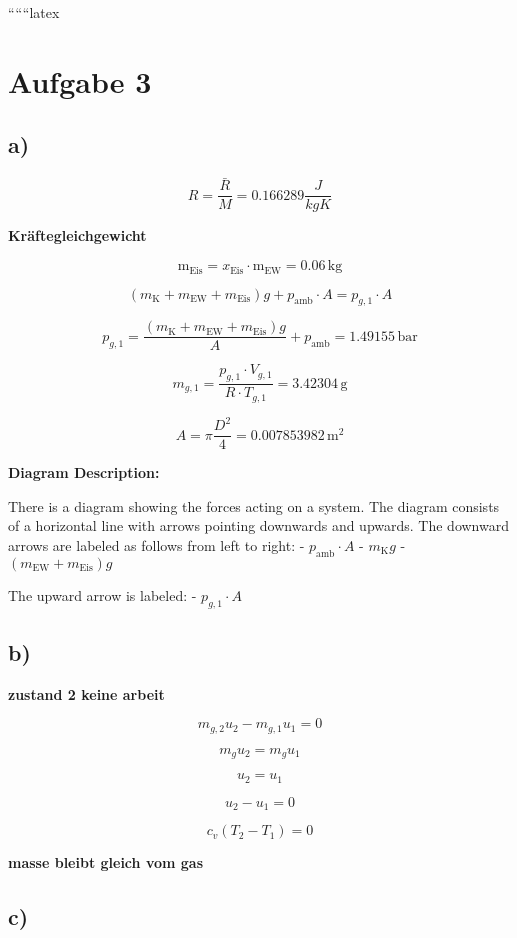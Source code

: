 
``````latex


\section*{Aufgabe 3}

\subsection*{a)}

\[
R = \frac{\bar{R}}{M} = 0.166289 \frac{J}{kgK}
\]

\textbf{Kräftegleichgewicht}

\[
\text{m}_{\text{Eis}} = x_{\text{Eis}} \cdot \text{m}_{\text{EW}} = 0.06 \, \text{kg}
\]

\[
(m_{\text{K}} + m_{\text{EW}} + m_{\text{Eis}})g + p_{\text{amb}} \cdot A = p_{g,1} \cdot A
\]

\[
p_{g,1} = \frac{(m_{\text{K}} + m_{\text{EW}} + m_{\text{Eis}})g}{A} + p_{\text{amb}} = 1.49155 \, \text{bar}
\]

\[
m_{g,1} = \frac{p_{g,1} \cdot V_{g,1}}{R \cdot T_{g,1}} = 3.42304 \, \text{g}
\]

\[
A = \pi \frac{D^2}{4} = 0.007853982 \, \text{m}^2
\]

\textbf{Diagram Description:}

There is a diagram showing the forces acting on a system. The diagram consists of a horizontal line with arrows pointing downwards and upwards. The downward arrows are labeled as follows from left to right:
- $p_{\text{amb}} \cdot A$
- $m_{\text{K}}g$
- $(m_{\text{EW}} + m_{\text{Eis}})g$

The upward arrow is labeled:
- $p_{g,1} \cdot A$

\subsection*{b)}

\textbf{zustand 2 keine arbeit}

\[
m_{g,2} u_{2} - m_{g,1} u_{1} = 0
\]

\[
m_{g} u_{2} = m_{g} u_{1}
\]

\[
u_{2} = u_{1}
\]

\[
u_{2} - u_{1} = 0
\]

\[
c_{v} (T_{2} - T_{1}) = 0
\]

\textbf{masse bleibt gleich vom gas}

\subsection*{c)}

